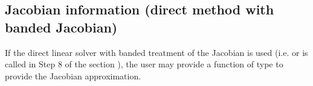 \documentclass[letterpaper,10pt,english]{sphinxmanual}
\begin{document}
\subsection{Jacobian information (direct method with banded Jacobian)}
\label{c_interface/User_supplied:cinterface-bandjacobianfn}\label{c_interface/User_supplied:jacobian-information-direct-method-with-banded-jacobian}
If the direct linear solver with banded treatment of the Jacobian is
used (i.e. {\hyperref[c_interface/User_callable:c.ARKBand]{\emph{}}} or {\hyperref[c_interface/User_callable:c.ARKLapackBand]{\emph{}}} is called
in Step 8 of the section {\hyperref[c_interface/Skeleton:cinterface-skeleton]{\emph{}}}), the user may
provide a function of type {\hyperref[c_interface/User_supplied:c.ARKDlsBandJacFn]{\emph{}}} to provide the
Jacobian approximation.
\end{document}
